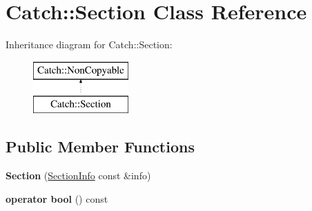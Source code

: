 \hypertarget{class_catch_1_1_section}{}\section{Catch\+:\+:Section Class Reference}
\label{class_catch_1_1_section}
Inheritance diagram for Catch\+:\+:Section\+:\begin{figure}[H]
\begin{center}
\leavevmode
\includegraphics[height=2.000000cm]{class_catch_1_1_section}
\end{center}
\end{figure}
\subsection*{Public Member Functions}
\begin{DoxyCompactItemize}
\item 
\mbox{\label{class_catch_1_1_section_a68fd4e51e8981aaa7ddb00d8a6abd099}} 
{\bfseries Section} (\mbox{\hyperlink{struct_catch_1_1_section_info}{Section\+Info}} const \&info)
\item 
\mbox{\label{class_catch_1_1_section_a0632b804dcea1417a2970620a9742eb3}} 
{\bfseries operator bool} () const
\end{DoxyCompactItemize}

